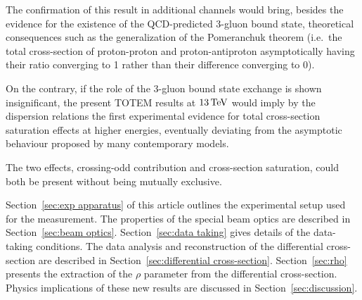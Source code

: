 The confirmation of this result in additional channels would bring, besides the evidence for the existence of the QCD-predicted 3-gluon bound state, theoretical consequences such as the generalization of the Pomeranchuk theorem (i.e.~the total cross-section of proton-proton and proton-antiproton asymptotically having their ratio converging to 1 rather than their difference converging to 0).

On the contrary, if the role of the 3-gluon bound state exchange is shown insignificant, the present TOTEM results at $13\,{\rm TeV}$ would imply by the dispersion relations the first experimental evidence for total cross-section saturation effects at higher energies, eventually deviating from the asymptotic behaviour proposed by many contemporary models.

The two effects, crossing-odd contribution and cross-section saturation, could both be present without being mutually exclusive.

Section~\ref{sec:exp apparatus} of this article outlines the experimental setup used for the measurement. The properties of the special beam optics are described in Section~\ref{sec:beam optics}. Section~\ref{sec:data taking} gives details of the data-taking conditions. The data analysis and reconstruction of the differential cross-section are described in Section~\ref{sec:differential cross-section}. Section~\ref{sec:rho} presents the extraction of the $\rho$ parameter from the differential cross-section. Physics implications of these new results are discussed in Section~\ref{sec:discussion}.

